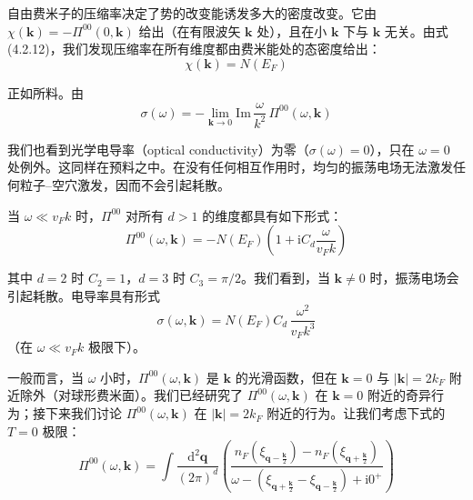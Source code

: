 自由费米子的压缩率决定了势的改变能诱发多大的密度改变。它由 $\chi(\pmb{k})=-\Pi^{00}(0,\pmb{k})$ 给出（在有限波矢 $\pmb{k}$ 处），且在小 $\pmb{k}$ 下与 $\pmb{k}$ 无关。由式 (4.2.12)，我们发现压缩率在所有维度都由费米能处的态密度给出：
\begin{equation*}
\chi(\pmb{k}) = N(E_F)
\end{equation*}

正如所料。由
\begin{equation*}
\sigma(\omega) = -\lim_{\pmb{k}\to 0}\mathrm{Im}\,\frac{\omega}{k^2}\,\Pi^{00}(\omega,\pmb{k})
\end{equation*}

我们也看到光学电导率（optical conductivity）为零（$\sigma(\omega)=0$），只在 $\omega=0$ 处例外。这同样在预料之中。在没有任何相互作用时，均匀的振荡电场无法激发任何粒子–空穴激发，因而不会引起耗散。

当 $\omega\ll v_F k$ 时，$\Pi^{00}$ 对所有 $d>1$ 的维度都具有如下形式：
\begin{equation*}
\Pi^{00}(\omega,\pmb{k}) = -N(E_F)\left(1+\mathrm{i}C_d\frac{\omega}{v_F k}\right)
\end{equation*}

其中 $d=2$ 时 $C_2=1$，$d=3$ 时 $C_3=\pi/2$。我们看到，当 $\pmb{k}\neq 0$ 时，振荡电场会引起耗散。电导率具有形式
\begin{equation*}
\sigma(\omega,\pmb{k}) = N(E_F)C_d\,\frac{\omega^2}{v_F k^3}
\end{equation*}
（在 $\omega\ll v_F k$ 极限下）。

一般而言，当 $\omega$ 小时，$\Pi^{00}(\omega,\pmb{k})$ 是 $\pmb{k}$ 的光滑函数，但在 $\pmb{k}=0$ 与 $|\pmb{k}|=2k_F$ 附近除外（对球形费米面）。我们已经研究了 $\Pi^{00}(\omega,\pmb{k})$ 在 $\pmb{k}=0$ 附近的奇异行为；接下来我们讨论 $\Pi^{00}(\omega,\pmb{k})$ 在 $|\pmb{k}|=2k_F$ 附近的行为。让我们考虑下式的 $T=0$ 极限：
\begin{equation*}
\Pi^{00}(\omega,\pmb{k}) = \int \frac{\mathrm{d}^2\pmb{q}}{(2\pi)^d}\left( \frac{n_F(\xi_{\pmb{q}-\frac{\pmb{k}}{2}})-n_F(\xi_{\pmb{q}+\frac{\pmb{k}}{2}})}{\omega-\left(\xi_{\pmb{q}+\frac{\pmb{k}}{2}}-\xi_{\pmb{q}-\frac{\pmb{k}}{2}}\right)+\mathrm{i}0^{+}} \right)
\end{equation*}

